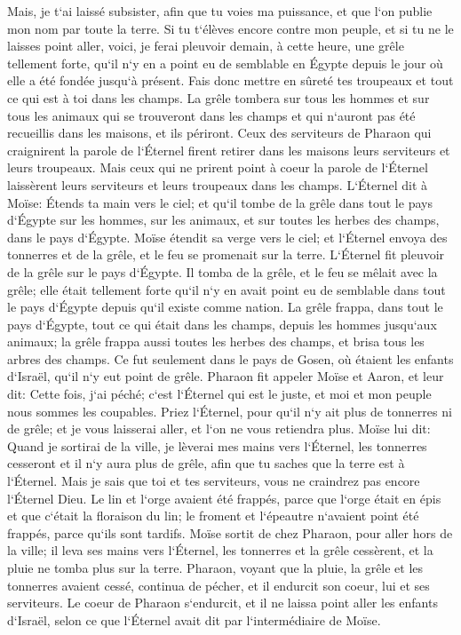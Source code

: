 \verse Mais, je t`ai laissé subsister, afin que tu voies ma puissance, et que l`on publie mon nom par toute la terre. 
\verse Si tu t`élèves encore contre mon peuple, et si tu ne le laisses point aller, 
\verse voici, je ferai pleuvoir demain, à cette heure, une grêle tellement forte, qu`il n`y en a point eu de semblable en Égypte depuis le jour où elle a été fondée jusqu`à présent. 
\verse Fais donc mettre en sûreté tes troupeaux et tout ce qui est à toi dans les champs. La grêle tombera sur tous les hommes et sur tous les animaux qui se trouveront dans les champs et qui n`auront pas été recueillis dans les maisons, et ils périront. 
\verse Ceux des serviteurs de Pharaon qui craignirent la parole de l`Éternel firent retirer dans les maisons leurs serviteurs et leurs troupeaux. 
\verse Mais ceux qui ne prirent point à coeur la parole de l`Éternel laissèrent leurs serviteurs et leurs troupeaux dans les champs. 
\verse L`Éternel dit à Moïse: Étends ta main vers le ciel; et qu`il tombe de la grêle dans tout le pays d`Égypte sur les hommes, sur les animaux, et sur toutes les herbes des champs, dans le pays d`Égypte. 
\verse Moïse étendit sa verge vers le ciel; et l`Éternel envoya des tonnerres et de la grêle, et le feu se promenait sur la terre. L`Éternel fit pleuvoir de la grêle sur le pays d`Égypte. 
\verse Il tomba de la grêle, et le feu se mêlait avec la grêle; elle était tellement forte qu`il n`y en avait point eu de semblable dans tout le pays d`Égypte depuis qu`il existe comme nation. 
\verse La grêle frappa, dans tout le pays d`Égypte, tout ce qui était dans les champs, depuis les hommes jusqu`aux animaux; la grêle frappa aussi toutes les herbes des champs, et brisa tous les arbres des champs. 
\verse Ce fut seulement dans le pays de Gosen, où étaient les enfants d`Israël, qu`il n`y eut point de grêle. 
\verse Pharaon fit appeler Moïse et Aaron, et leur dit: Cette fois, j`ai péché; c`est l`Éternel qui est le juste, et moi et mon peuple nous sommes les coupables. 
\verse Priez l`Éternel, pour qu`il n`y ait plus de tonnerres ni de grêle; et je vous laisserai aller, et l`on ne vous retiendra plus. 
\verse Moïse lui dit: Quand je sortirai de la ville, je lèverai mes mains vers l`Éternel, les tonnerres cesseront et il n`y aura plus de grêle, afin que tu saches que la terre est à l`Éternel. 
\verse Mais je sais que toi et tes serviteurs, vous ne craindrez pas encore l`Éternel Dieu. 
\verse Le lin et l`orge avaient été frappés, parce que l`orge était en épis et que c`était la floraison du lin; 
\verse le froment et l`épeautre n`avaient point été frappés, parce qu`ils sont tardifs. 
\verse Moïse sortit de chez Pharaon, pour aller hors de la ville; il leva ses mains vers l`Éternel, les tonnerres et la grêle cessèrent, et la pluie ne tomba plus sur la terre. 
\verse Pharaon, voyant que la pluie, la grêle et les tonnerres avaient cessé, continua de pécher, et il endurcit son coeur, lui et ses serviteurs. 
\verse Le coeur de Pharaon s`endurcit, et il ne laissa point aller les enfants d`Israël, selon ce que l`Éternel avait dit par l`intermédiaire de Moïse. 

